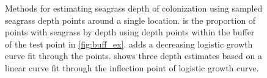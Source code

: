 \documentclass[letterpaper,12pt,oneside]{article}\usepackage[]{graphicx}\usepackage[]{color}
\begin{document}
\begin{figure}
\centering
{}


\caption{Methods for estimating seagrass depth of colonization using sampled seagrass depth points around a single location.  is the proportion of points with seagrass by depth using depth points within the buffer of the test point in \cref{fig:buff_ex}.   adds a decreasing logistic growth curve fit through the points.   shows three depth estimates based on a linear curve fit through the inflection point of logistic growth curve.}
\label{fig:est_ex}
\end{figure}

\end{document}
